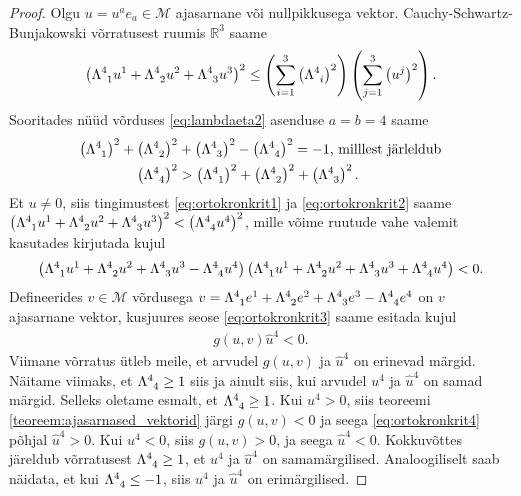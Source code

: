 \documentclass[a4paper,12pt]{article}
\theoremstyle{plain}
\theoremstyle{definition}
\numberwithin{equation}{section}
\def\R{{\mathbb R}}
\def\M{{\mathcal M}}
\begin{document}
\begin{proof}
Olgu $u = u^a e_a \in \M$ ajasarnane või nullpikkusega vektor. Cauchy-Schwartz-Bunjakowski võrratusest ruumis $\R^{3}$ saame
\begin{align} \label{eq:ortokronkrit1}
\left(\Lambda\indices{^4_1} u^1 + \Lambda\indices{^4_2} u^2 + \Lambda\indices{^4_3} u^3\right)^2 \leq \left(\sum_{i = 1}^{3} \left(\Lambda\indices{^4_i}\right)^2 \right) \left(\sum_{j = 1}^{3} \left(u^j\right)^2 \right).
\end{align}
Sooritades nüüd võrduses \ref{eq:lambdaeta2} asenduse $a = b = 4$ saame
\begin{align} \label{eq:ortokronkrit2}
\left(\Lambda\indices{^4_1}\right)^2 + \left(\Lambda\indices{^4_2}\right)^2 &+ \left(\Lambda\indices{^4_3}\right)^2 - \left(\Lambda\indices{^4_4}\right)^2 = -1 \text{, milllest järleldub} \nonumber \\
\left(\Lambda\indices{^4_4}\right)^2 &> \left(\Lambda\indices{^4_1}\right)^2 + \left(\Lambda\indices{^4_2}\right)^2 + \left(\Lambda\indices{^4_3}\right)^2.
\end{align}
Et $u \neq 0$, siis tingimustest \ref{eq:ortokronkrit1} ja \ref{eq:ortokronkrit2} saame $\left(\Lambda\indices{^4_1} u^1 + \Lambda\indices{^4_2} u^2 + \Lambda\indices{^4_3} u^3\right)^2 < \left(\Lambda\indices{^4_4} u^4\right)^2$, mille võime ruutude vahe valemit kasutades kirjutada kujul
\begin{align} \label{eq:ortokronkrit3}
\left(\Lambda\indices{^4_1} u^1 + \Lambda\indices{^4_2} u^2 + \Lambda\indices{^4_3} u^3 - \Lambda\indices{^4_4} u^4\right)\left(\Lambda\indices{^4_1} u^1 + \Lambda\indices{^4_2} u^2 + \Lambda\indices{^4_3} u^3 + \Lambda\indices{^4_4} u^4\right) < 0.
\end{align}
Defineerides $v \in \M$ võrdusega $v = \Lambda\indices{^4_1} e^1 + \Lambda\indices{^4_2} e^2 + \Lambda\indices{^4_3} e^3 - \Lambda\indices{^4_4} e^4$ on $v$ ajasarnane vektor, kusjuures seose \ref{eq:ortokronkrit3} saame esitada kujul
\begin{align} \label{eq:ortokronkrit4}
g\left(u , v\right)\hat{u}^4 < 0.
\end{align}
Viimane võrratus ütleb meile, et arvudel $g\left(u,v\right)$ ja $\hat{u}^4$ on erinevad märgid.
Näitame viimaks, et $\Lambda\indices{^4_4} \geq 1$ siis ja ainult siis, kui arvudel $u^4$ ja $\hat{u}^4$ on samad märgid.
Selleks oletame esmalt, et $\Lambda\indices{^4_4} \geq 1$. Kui $u^4 > 0$, siis teoreemi \ref{teoreem:ajasarnased_vektorid} järgi $g\left(u, v\right) < 0$ ja seega \ref{eq:ortokronkrit4} põhjal $\hat{u}^4 >0$. Kui $u^4 < 0$, siis $g\left(u, v\right) > 0$, ja seega $\hat{u}^4 < 0$. Kokkuvõttes järeldub võrratusest $\Lambda\indices{^4_4} \geq 1$, et $u^4$ ja $\hat{u}^4$ on samamärgilised. Analoogiliselt saab näidata, et kui $\Lambda\indices{^4_4} \leq -1$, siis $u^4$ ja $\hat{u}^4$ on erimärgilised.
\end{proof}
\end{document}
